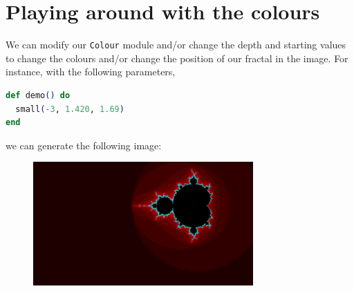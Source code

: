 \section{Playing around with the colours}
We can modify our \texttt{Colour} module and/or change the depth and starting values to change the colours and/or change the position of our fractal in the image. For instance, with the following parameters, 

\begin{lstlisting}[language=Elixir]
def demo() do
  small(-3, 1.420, 1.69)
end
\end{lstlisting}
we can generate the following image:
\begin{figure}[h!]
    \centering
    \includegraphics[width=0.75\textwidth]{img/new_ex}
\end{figure}